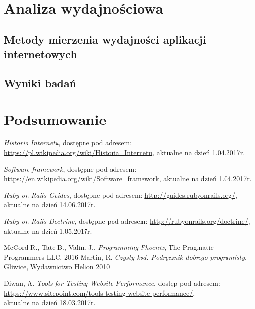\documentclass[mgr,oneside]{mgr}
\begin{document}
\chapter{Analiza wydajnościowa}
\label{cha:analiza_wydajnosciowa}
\section{Metody mierzenia wydajności aplikacji internetowych}
\section{Wyniki badań}

\chapter{Podsumowanie}
\renewcommand\bibname{Literatura}
\begin{thebibliography}{inteligencja}

  \emph{Historia Internetu}, dostępne pod adresem: \url{https://pl.wikipedia.org/wiki/Historia_Internetu}, aktualne na dzień 1.04.2017r.

  \emph{Software framework}, dostępne pod adresem: \url{https://en.wikipedia.org/wiki/Software_framework}, aktualne na dzień 1.04.2017r.

	\emph{Ruby on Rails Guides}, dostępne pod adresem: \url{http://guides.rubyonrails.org/},\\ aktualne na dzień 14.06.2017r.

  \emph{Ruby on Rails Doctrine}, dostępne pod adresem: \url{http://rubyonrails.org/doctrine/}, aktualne na dzień 1.05.2017r.

  McCord R., Tate B., Valim J., \emph{Programming Phoenix}, The Pragmatic Programmers LLC, 2016
	Martin, R. \emph{Czysty kod. Podręcznik dobrego programisty}, Gliwice, Wydawnictwo Helion 2010

  Diwan, A. \emph{Tools for Testing Website Performance}, dostęp pod adresem: \url{https://www.sitepoint.com/tools-testing-website-performance/}, \\ aktualne na dzień 18.03.2017r.

\end{thebibliography}
\end{document}
